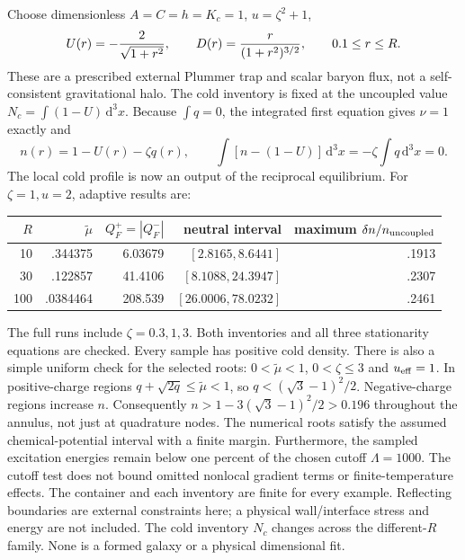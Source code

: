 \documentclass[11pt]{article}
\newcommand{\dd}{\mathrm d}
\begin{document}
Choose dimensionless $A=C=h=K_c=1$, $u=\zeta^2+1$,
\begin{equation}
 U(r)=-{2\over\sqrt{1+r^2}},\qquad
 D(r)={r\over(1+r^2)^{3/2}},\qquad 0.1\leq r\leq R.
\end{equation}
These are a prescribed external Plummer trap and scalar baryon flux, not
a self-consistent gravitational halo. The cold inventory is fixed at the
uncoupled value $N_c=\int(1-U)\,\dd^3x$. Because $\int q=0$,
the integrated first equation gives $\nu=1$ exactly and
\begin{equation}
 n(r)=1-U(r)-\zeta q(r),\qquad
 \int[n-(1-U)]\,\dd^3x=-\zeta\int q\,\dd^3x=0.
\end{equation}
The local cold profile is now an output of the reciprocal equilibrium.
For $\zeta=1,u=2$, adaptive results are:
\begin{center}
\begin{tabular}{rrrrr}
\toprule
$R$ & $\widetilde\mu$ & $Q_F^+=|Q_F^-|$ & neutral interval
 & maximum $\delta n/n_{\rm uncoupled}$\\
\midrule
10 & .344375 & 6.03679 & $[2.8165,8.6441]$ & .1913\\
30 & .122857 & 41.4106 & $[8.1088,24.3947]$ & .2307\\
100 & .0384464 & 208.539 & $[26.0006,78.0232]$ & .2461\\
\bottomrule
\end{tabular}
\end{center}
The full runs include $\zeta=0.3,1,3$. Both inventories and all three
stationarity equations are checked. Every sample has positive cold density.
There is also a simple uniform check for the selected roots:
$0<\widetilde\mu<1$, $0<\zeta\leq3$ and $u_{\rm eff}=1$.
In positive-charge regions $q+\sqrt{2q}\leq\widetilde\mu<1$, so
$q<(\sqrt3-1)^2/2$. Negative-charge regions increase $n$.
Consequently $n>1-3(\sqrt3-1)^2/2>0.196$ throughout the annulus,
not just at quadrature nodes. The numerical roots satisfy the assumed
chemical-potential interval with a finite margin.
Furthermore,
the sampled excitation energies remain below one percent of the chosen
cutoff $\Lambda=1000$. The cutoff test does not bound omitted nonlocal
gradient terms or finite-temperature effects. The container and each
inventory are finite for every example. Reflecting boundaries are external
constraints here; a physical wall/interface stress and energy are not
included. The cold inventory $N_c$ changes across the
different-$R$ family. None is a formed galaxy or a physical dimensional fit.
\end{document}

